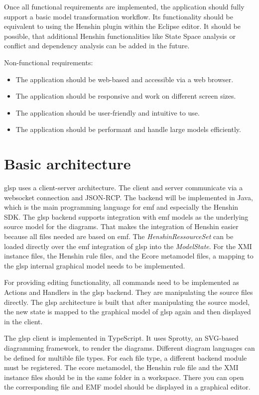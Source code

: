 \documentclass[conference,onecolumn]{IEEEtran}
\begin{document}
  Once all functional requirements are implemented, the application should fully support a basic model transformation workflow. Its functionality should be equivalent to using the Henshin plugin within the Eclipse editor. It should be possible, that additional Henshin functionalities like State Space analysis or conflict and dependency analysis can be added in the future.


  Non-functional requirements:

  \begin{itemize}
    \item The application should be web-based and accessible via a web browser.
    \item The application should be responsive and work on different screen sizes.
    \item The application should be user-friendly and intuitive to use.
    \item The application should be performant and handle large models efficiently.
\end{itemize}

  \section{Basic architecture}
  \label{subsec:architecture}

  \ac{glsp} uses a client-server architecture. The client and server communicate via a websocket connection and JSON-RCP. The backend will be implemented in Java, which is the main programming language for \ac{emf} and especially the Henshin SDK. The \ac{glsp} backend supports integration with \ac{emf} models as the underlying source model for the diagrams. That makes the integration of Henshin easier because all files needed are based on \ac{emf}. The \textit{HenshinRessourceSet} can be loaded directly over the \ac{emf} integration of \ac{glsp} into the \textit{ModelState}. For the XMI instance files, the Henshin rule files, and the Ecore metamodel files, a mapping to the \ac{glsp} internal graphical model needs to be implemented. \cite{eclipseGLSP}

  For providing editing functionality, all commands need to be implemented as Actions and Handlers in the \ac{glsp} backend. They are manipulating the source files directly. The \ac{glsp} architecture is built that after manipulating the source model, the new state is mapped to the graphical model of \ac{glsp} again and then displayed in the client. \cite{eclipseGLSP} 

  The \ac{glsp} client is implemented in TypeScript. It uses Sprotty, an SVG-based diagramming framework, to render the diagrams.
  Different diagram languages can be defined for multible file types. For each file type, a different backend module must be registered. The ecore metamodel, the Henshin rule file and the XMI instance files should be in the same folder in a workspace. There you can open the corresponding file and EMF model should be displayed in a graphical editor.
  
\end{document}
